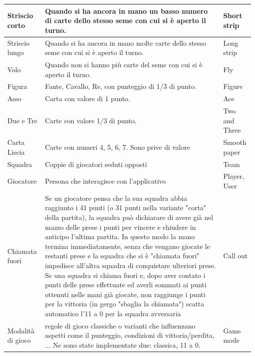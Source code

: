 \begin{table}[!ht]
\begin{adjustbox}{max width=1.1\textwidth,center}
\begin{tabular}{|l|p{10cm}|l|}
        Striscio corto & Quando si ha ancora in mano un basso numero di carte dello stesso seme con cui si è aperto il turno. & Short strip \\ \hline
        Striscio lungo & Quando si ha ancora in mano molte carte dello stesso seme con cui si è aperto il turno. & Long strip \\ \hline
        Volo & Quando non si hanno più carte del seme con cui si è aperto il turno. & Fly \\ \hline
        Figura & Fante, Cavallo, Re, con punteggio di 1/3 di punto. & Figure \\ \hline
        Asso & Carta con valore di 1 punto. & Ace \\ \hline
        Due e Tre & Carte con valore 1/3 di punto. & Two and Three \\ \hline
        Carta Liscia & Carte con numeri 4, 5, 6, 7. Sono prive di valore & Smooth paper \\ \hline
        Squadra & Coppie di giocatori seduti opposti & Team \\ \hline
        Giocatore & Persona che interagisce con l’applicativo & Player, User \\ \hline
        Chiamata fuori & Se un giocatore pensa che la sua squadra abbia raggiunto i 41 punti (o 31 punti nella variante "corta" della partita), la squadra può  dichiarare di avere già nel mazzo delle prese i punti per vincere e chiudere in anticipo l'ultima partita. In questo modo la mano termina immediatamente, senza che vengano giocate le restanti prese e la squadra che si è "chiamata fuori" impedisce all'altra squadra di conquistare ulteriori prese. Se una squadra si chiama fuori e, dopo aver contato i punti delle prese effettuate ed averli sommati ai punti ottenuti nelle mani già giocate, non raggiunge i punti per la vittoria (in gergo "sbaglia la chiamata") scatta automatico l'11 a 0 per la squadra avversaria & Call out \\ \hline
        Modalità di gioco & regole di gioco classiche o varianti che influenzano aspetti come il punteggio, condizioni di vittoria/perdita, ... Ne sono state implementate due: classica, 11 a 0.& Game mode \\ \hline
    \end{tabular}
    \end{adjustbox}
\end{table}
\newpage
